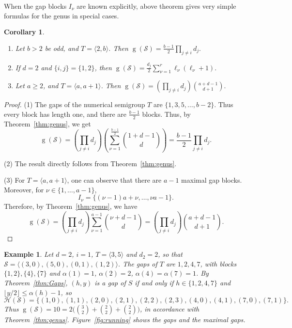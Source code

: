 \documentclass[12pt]{amsart}
\theoremstyle{plain}
\theoremstyle{theorem}
\newtheorem{corollary}[definition]{Corollary}
\newtheorem{example}[definition]{Example}
\theoremstyle{remark}
\begin{document}
When the gap blocks $I_{\nu}$ are known explicitly, above theorem gives very simple formulas for the genus in special cases.

\begin{corollary}
\begin{enumerate}
    \item Let $b>2$ be odd, and $T=\langle 2,b\rangle$. Then $\operatorname{g}(\mathcal{S})	= \frac{b-1}{2}
	\prod_{j\neq i}d_j.$
    \item If $d=2$ and $\{i,j\} = \{1,2\}$, then $\operatorname{g}(\mathcal{S}) =  \frac{d_j}{2}\sum_{\nu=1}^{r}\ell_{\nu}(\ell_{\nu}+1).$
    \item Let $a \geq 2$, and $T=\langle a,a+1\rangle$. Then $\operatorname{g}(\mathcal{S}) = \left( \prod_{j\neq i}d_j \right) \binom{a+d-1}{d+1}.$
\end{enumerate}
\end{corollary}
\begin{proof}
    (1) The gaps of the numerical semigroup $T$ are $\{1,3,5,\ldots,b-2\}$. Thus every block has length one, and there are $\frac{b-1}{2}$ blocks. Thus, by Theorem~\ref{thm:genus}, we get \[
	\operatorname{g}(\mathcal{S})
	= \left(\prod_{j\neq i}d_j \right)
	\left(
	\sum_{\nu =1}^{\frac{b-1}{2}}
	\binom{1+d-1}{d}
	\right)
	=
	\frac{b-1}{2}
	\prod_{j\neq i}d_j.
	\]

    (2) The result directly follows from Theorem~\ref{thm:genus}.

    (3) For $T=\langle a,a+1\rangle$, one can observe that there are $a-1$ maximal gap blocks. Moreover, for $\nu \in \{1,\ldots,a-1\}$, \[I_{\nu} = \{(\nu-1)a+\nu, \ldots, \nu a -1\}.\] 
	Therefore, by Theorem~\ref{thm:genus}, we have
	\[\operatorname{g}(\mathcal{S}) = \left( \prod_{j\neq i}d_j \right) \sum_{\nu = 1}^{a-1} \binom{\nu + d -1}{d} = \left( \prod_{j\neq i}d_j \right) \binom{a+d-1}{d+1}.\]
\end{proof}


\begin{example}\label{ex:running}
Let $d=2$, $i=1$, $T=\langle3,5\rangle$ and $d_2=2$, so that $\mathcal{S}=\langle(3,0),\allowbreak(5,0),\allowbreak(0,1),\allowbreak(1,2)\rangle$. The gaps of $T$ are $1,2,4,7$, with blocks $\{1,2\},\{4\},\{7\}$ and $\alpha(1)=1$, $\alpha(2)=2$, $\alpha(4)=\alpha(7)=1$. By Theorem~\ref{thm:Gaps}, $(h,y)$ is a gap of $S$ if and only if $h\in\{1,2,4,7\}$ and $\lfloor y/2\rfloor\le\alpha(h)-1$, so
\[
\mathcal{H}(\mathcal{S})=\{(1,0),(1,1),(2,0),(2,1),(2,2),(2,3),(4,0),(4,1),(7,0),(7,1)\}.
\]
Thus $\operatorname{g}(\mathcal{S})=10=2\big(\binom32+\binom22+\binom22\big)$, in accordance with Theorem~\ref{thm:genus}. Figure~\ref{fig:running} shows the gaps and the maximal gaps.
\end{example}
\end{document}
